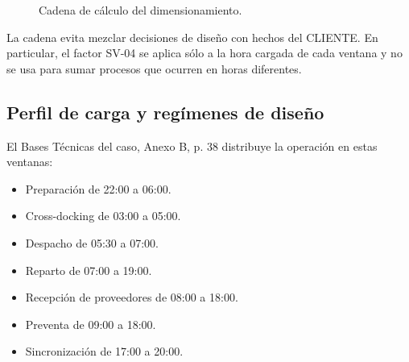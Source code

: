 \begin{figure}[htbp]
  \centering
  \LFXcuerpofigura
  \caption{Cadena de cálculo del dimensionamiento.}
  \label{fig:dimensionamiento-cadena}
  \fuentefigura
\end{figure}

La cadena evita mezclar decisiones de diseño con hechos del CLIENTE. En particular, el factor SV-04 se aplica sólo a la hora cargada de cada ventana y no se usa para sumar procesos que ocurren en horas diferentes.

\subsection{Perfil de carga y regímenes de diseño}
\label{sec:dimensionamiento-regimenes}

El Bases Técnicas del caso, Anexo B, p. 38 distribuye la operación en estas ventanas:

\begin{itemize}
  \item Preparación de 22:00 a 06:00.
  \item Cross-docking de 03:00 a 05:00.
  \item Despacho de 05:30 a 07:00.
  \item Reparto de 07:00 a 19:00.
  \item Recepción de proveedores de 08:00 a 18:00.
  \item Preventa de 09:00 a 18:00.
  \item Sincronización de 17:00 a 20:00.
\end{itemize}

